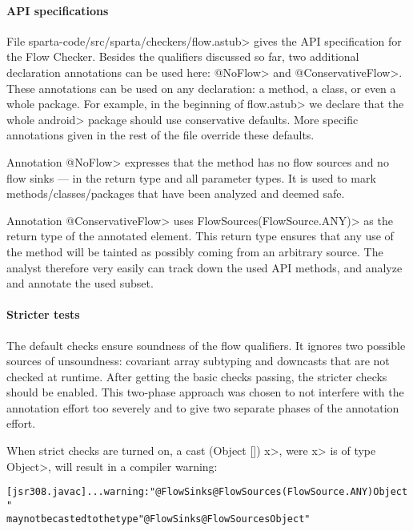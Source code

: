 \paragraph{API specifications}

File \<sparta-code/src/sparta/checkers/flow.astub> gives the API
specification for the Flow Checker.
Besides the qualifiers discussed so far, two additional declaration
annotations can be used here: \<@NoFlow> and \<@ConservativeFlow>.
These annotations can be used on any declaration: a method, a class,
or even a whole package.
For example, in the beginning of \<flow.astub> we declare that the
whole \<android> package should use conservative defaults.
More specific annotations given in the rest of the file override these
defaults.

Annotation \<@NoFlow> expresses that the method has no flow sources
and no flow sinks --- in the return type and all parameter types.
It is used to mark methods/classes/packages that have been analyzed
and deemed safe.

Annotation \<@ConservativeFlow> uses
\<FlowSources(FlowSource.ANY)> as the return type of the annotated
element.
This return type ensures that any use of the method will be tainted as
possibly coming from an arbitrary source.
The analyst therefore very easily can track down the used API methods,
and analyze and annotate the used subset.



\paragraph{Stricter tests}

The default checks ensure soundness of the flow qualifiers.
It ignores two possible sources of unsoundness: covariant array
subtyping and downcasts that are not checked at runtime.
After getting the basic checks passing, the stricter checks should be
enabled.
This two-phase approach was chosen to not interfere with
the annotation effort too severely and to give two separate phases of
the annotation effort.


When strict checks are turned on,
a cast \<(Object []) x>, were \<x> is of type \<Object>, will result
in a compiler warning:

\begin{alltt}
[jsr308.javac] ... warning: "@FlowSinks @FlowSources({FlowSource.ANY}) Object"
       may not be casted to the type "@FlowSinks @FlowSources Object"
\end{alltt}

